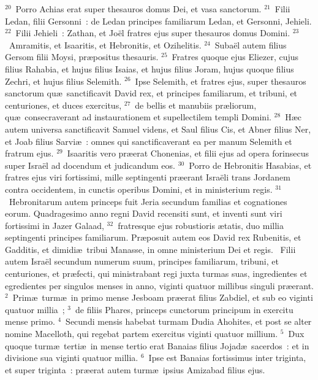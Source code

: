 ${}^{20}$~Porro Achias erat super thesauros domus Dei, et vasa sanctorum.
${}^{21}$~Filii Ledan, filii Gersonni~: de Ledan principes familiarum Ledan, et Gersonni, Jehieli.
${}^{22}$~Filii Jehieli~: Zathan, et Jo\"el fratres ejus super thesauros domus Domini.
${}^{23}$~Amramitis, et Isaaritis, et Hebronitis, et Ozihelitis.
${}^{24}$~Suba\"el autem filius Gersom filii Moysi, pr\ae positus thesauris.
${}^{25}$~Fratres quoque ejus Eliezer, cujus filius Rahabia, et hujus filius Isaias, et hujus filius Joram, hujus quoque filius Zechri, et hujus filius Selemith.
${}^{26}$~Ipse Selemith, et fratres ejus, super thesauros sanctorum qu\ae\ sanctificavit David rex, et principes familiarum, et tribuni, et centuriones, et duces exercitus,
${}^{27}$~de bellis et manubiis pr\ae liorum, qu\ae\ consecraverant ad instaurationem et supellectilem templi Domini.
${}^{28}$~H\ae c autem universa sanctificavit Samuel videns, et Saul filius Cis, et Abner filius Ner, et Joab filius Sarvi\ae~: omnes qui sanctificaverant ea per manum Selemith et fratrum ejus.
${}^{29}$~Isaaritis vero pr\ae erat Chonenias, et filii ejus ad opera forinsecus super Isra\"el ad docendum et judicandum eos.
${}^{30}$~Porro de Hebronitis Hasabias, et fratres ejus viri fortissimi, mille septingenti pr\ae erant Isra\"eli trans Jordanem contra occidentem, in cunctis operibus Domini, et in ministerium regis.
${}^{31}$~Hebronitarum autem princeps fuit Jeria secundum familias et cognationes eorum. Quadragesimo anno regni David recensiti sunt, et inventi sunt viri fortissimi in Jazer Galaad,
${}^{32}$~fratresque ejus robustioris \ae tatis, duo millia septingenti principes familiarum. Pr\ae posuit autem eos David rex Rubenitis, et Gadditis, et dimidi\ae\ tribui Manasse, in omne ministerium Dei et regis.
~Filii autem Isra\"el secundum numerum suum, principes familiarum, tribuni, et centuriones, et pr\ae fecti, qui ministrabant regi juxta turmas suas, ingredientes et egredientes per singulos menses in anno, viginti quatuor millibus singuli pr\ae erant.
${}^{2}$~Prim\ae\ turm\ae\ in primo mense Jesboam pr\ae erat filius Zabdiel, et sub eo viginti quatuor millia~;
${}^{3}$~de filiis Phares, princeps cunctorum principum in exercitu mense primo.
${}^{4}$~Secundi mensis habebat turmam Dudia Ahohites, et post se alter nomine Macelloth, qui regebat partem exercitus viginti quatuor millium.
${}^{5}$~Dux quoque turm\ae\ terti\ae\ in mense tertio erat Banaias filius Jojad\ae\ sacerdos~: et in divisione sua viginti quatuor millia.
${}^{6}$~Ipse est Banaias fortissimus inter triginta, et super triginta~: pr\ae erat autem turm\ae\ ipsius Amizabad filius ejus.
